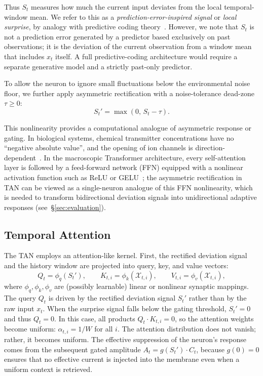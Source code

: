 Thus $S_t$ measures how much the current input deviates from the local temporal-window mean. We refer to this as a \textit{prediction-error-inspired signal} or \textit{local surprise}, by analogy with predictive coding theory~\cite{friston2010,rao1999,srinivasan1982,friston2017}. However, we note that $S_t$ is not a prediction error generated by a predictor based exclusively on past observations; it is the deviation of the current observation from a window mean that includes $x_t$ itself. A full predictive-coding architecture would require a separate generative model and a strictly past-only predictor.

To allow the neuron to ignore small fluctuations below the environmental noise floor, we further apply asymmetric rectification with a noise-tolerance dead-zone $\tau \geq 0$:
\begin{equation}
S_t' = \max(0,\, S_t - \tau).
\end{equation}

This nonlinearity provides a computational analogue of asymmetric response or gating. In biological systems, chemical transmitter concentrations have no ``negative absolute value'', and the opening of ion channels is direction-dependent~\cite{kandel2000}. In the macroscopic Transformer architecture, every self-attention layer is followed by a feed-forward network (FFN) equipped with a nonlinear activation function such as ReLU or GELU~\cite{vaswani2017}; the asymmetric rectification in TAN can be viewed as a single-neuron analogue of this FFN nonlinearity, which is needed to transform bidirectional deviation signals into unidirectional adaptive responses (see~\S\ref{sec:evaluation}).

\subsection{Temporal Attention}

The TAN employs an attention-like kernel. First, the rectified deviation signal and the history window are projected into query, key, and value vectors:
\begin{equation}
Q_t = \phi_q(S_t'), \qquad K_{t,i} = \phi_k(\mathcal{X}_{t,i}), \qquad V_{t,i} = \phi_v(\mathcal{X}_{t,i}),
\end{equation}
where $\phi_q, \phi_k, \phi_v$ are (possibly learnable) linear or nonlinear synaptic mappings. The query $Q_t$ is driven by the rectified deviation signal $S_t'$ rather than by the raw input $x_t$. When the surprise signal falls below the gating threshold, $S_t' = 0$ and thus $Q_t = 0$. In this case, all products $Q_t \cdot K_{t,i} = 0$, so the attention weights become uniform: $\alpha_{t,i} = 1/W$ for all $i$. The attention distribution does not vanish; rather, it becomes uniform. The effective suppression of the neuron's response comes from the subsequent gated amplitude $A_t = g(S_t') \cdot C_t$, because $g(0) = 0$ ensures that no effective current is injected into the membrane even when a uniform context is retrieved.

